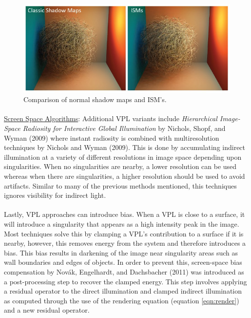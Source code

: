 \begin{figure}[h!]
  \centering
    \includegraphics[width=1.0\textwidth]{ISMcompare.jpg}
  \caption{Comparison of normal shadow maps and ISM's.}
	\label{fig:ISMcompare}
\end{figure}

\paragraph{}
\underline{Screen Space Algorithms}: Additional VPL variants include \textit{Hierarchical Image-Space Radiosity for Interactive Global Illumination} by Nichols, Shopf, and Wyman (2009) where instant radiosity is combined with multiresolution techniques by Nichols and Wyman (2009).  This is done by accumulating indirect illumination at a variety of different resolutions in image space depending upon singularities.  When no singularities are nearby, a lower resolution can be used whereas when there are singularities, a higher resolution should be used to avoid artifacts.  Similar to many of the previous methods mentioned, this techniques ignores visibility for indirect light.

\paragraph{}
Lastly, VPL approaches can introduce bias.  When a VPL is close to a surface, it will introduce a singularity that appears as a high intensity peak in the image.  Most techniques solve this by clamping a VPL's contribution to a surface if it is nearby, however, this removes energy from the system and therefore introduces a bias.  This bias results in darkening of the image near singularity areas such as wall boundaries and edges of objects.  In order to prevent this, screen-space bias compensation by Novák, Engelhardt, and Dachsbacher (2011) was introduced as a post-processing step to recover the clamped energy.  This step involves applying a residual operator to the direct illumination and clamped indirect illumination as computed through the use of the rendering equation (equation \ref{eqn:render}) and a new residual operator.

